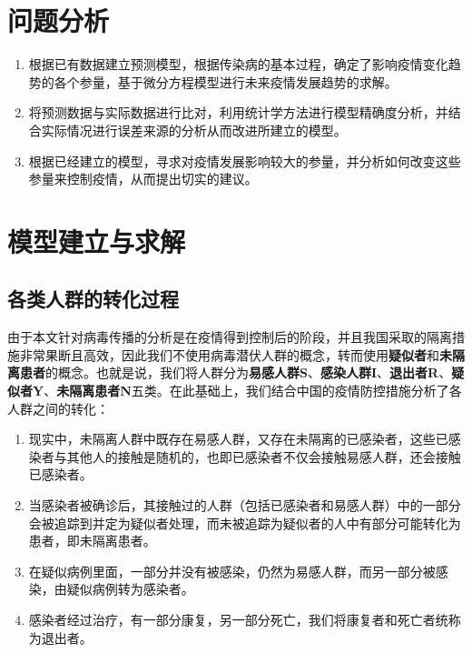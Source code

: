 \documentclass[UTF8]{ctexart}
\begin{document}
		
	\section{问题分析}
	
\vspace{4pt}
\begin{enumerate}[1)]
    \item  根据已有数据建立预测模型，根据传染病的基本过程，确定了影响疫情变化趋势的各个参量，基于微分方程模型进行未来疫情发展趋势的求解。

    \item  将预测数据与实际数据进行比对，利用统计学方法进行模型精确度分析，并结合实际情况进行误差来源的分析从而改进所建立的模型。

    \item  根据已经建立的模型，寻求对疫情发展影响较大的参量，并分析如何改变这些参量来控制疫情，从而提出切实的建议。
\end{enumerate}  



	\section{模型建立与求解}
		\subsection{各类人群的转化过程}
		
		由于本文针对病毒传播的分析是在疫情得到控制后的阶段，并且我国采取的隔离措施非常果断且高效，因此我们不使用病毒潜伏人群的概念，转而使用\textbf{疑似者}和\textbf{未隔离患者}的概念。也就是说，我们将人群分为\textbf{易感人群S}、\textbf{感染人群I}、\textbf{退出者R}、\textbf{疑似者Y}、\textbf{未隔离患者N}五类。在此基础上，我们结合中国的疫情防控措施分析了各人群之间的转化：
		\begin{enumerate}[1)]
		\item 现实中，未隔离人群中既存在易感人群，又存在未隔离的已感染者，这些已感染者与其他人的接触是随机的，也即已感染者不仅会接触易感人群，还会接触已感染者。\vspace{-0.5ex}
		\item 当感染者被确诊后，其接触过的人群（包括已感染者和易感人群）中的一部分会被追踪到并定为疑似者处理，而未被追踪为疑似者的人中有部分可能转化为患者，即未隔离患者。\vspace{-0.5ex}
		\item 在疑似病例里面，一部分并没有被感染，仍然为易感人群，而另一部分被感染，由疑似病例转为感染者。\vspace{-0.5ex}
		\item 感染者经过治疗，有一部分康复，另一部分死亡，我们将康复者和死亡者统称为退出者。
		\end{enumerate}
		
\end{document}
